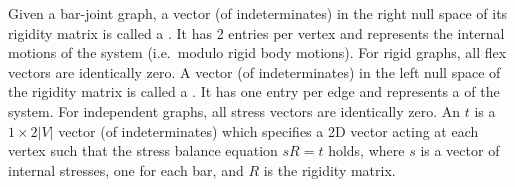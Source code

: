 






Given a bar-joint graph, a vector (of indeterminates) in the right null space of its rigidity matrix is called a . It has 2 entries per vertex and represents the internal motions of the system (i.e.\ modulo rigid body motions). For rigid graphs, all flex vectors are identically zero.
%
A vector (of indeterminates) in the left null space of the rigidity matrix is called a . It has one entry per edge and represents a  of the system. For independent graphs, all stress vectors are identically zero.
%
An  $t$ is a $1\times 2|V|$ vector  (of indeterminates) which specifies a 2D vector acting at each vertex such that the stress balance equation $sR = t$ holds, where $s$ is a vector of internal stresses, one for each bar, and $R$ is the rigidity matrix.
